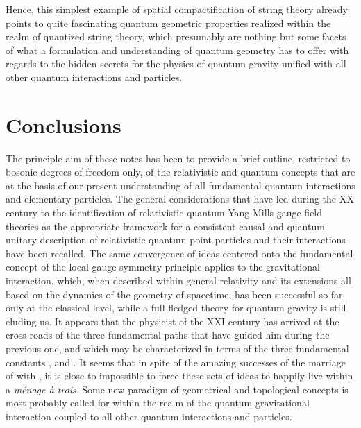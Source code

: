 \documentclass[a4paper,11pt]{article}
\begin{document}
Hence, this simplest example of spatial compactification of string
theory already points to quite fascinating quantum geometric properties
realized within the realm of quantized string theory, which presumably
are nothing but some facets of what a formulation and understanding of 
quantum geometry has to offer with regards to the hidden secrets for
the physics of quantum gravity unified with all other quantum interactions 
and particles.


\section{Conclusions}
\label{Sect9}

The principle aim of these notes has been to provide a brief outline,
restricted to bosonic degrees of freedom only, of the
relativistic and quantum concepts that are at the basis of our present
understanding of all fundamental quantum interactions and elementary
particles. The general considerations that have led during the XX\coordHE{}
century to the identification of relativistic quantum Yang-Mills gauge field
theories as the appropriate framework for a consistent causal and
quantum unitary description of relativistic quantum point-particles
and their interactions have been recalled. The same convergence of
ideas centered onto the fundamental concept of the local gauge
symmetry principle applies to the gravitational interaction, which,
when des\-cri\-bed within general relativity and its extensions all based
on the dynamics of the geometry of spacetime, has been successful so far
only at the classical level, while a full-fledged theory for quantum
gravity is still eluding us. It appears that the physicist of the 
XXI\coordHE{} century has arrived at the cross-roads of the three fundamental
paths that have guided him during the previous one, and which may be
characterized in terms of the three fundamental constants \coordHE{}, \myHighlight{$\hbar$}\coordHE{} and
\coordHE{}. It seems that in spite of the amazing successes of the marriage
of \coordHE{} with \myHighlight{$\hbar$}\coordHE{}, it is close to impossible to force these sets of ideas 
to happily live within a {\sl m\'enage \`a trois\/}. Some new paradigm
of geometrical and topological concepts is most probably called for within
the realm of the quantum gravitational interaction coupled to all other
quantum interactions and particles.
\end{document}
